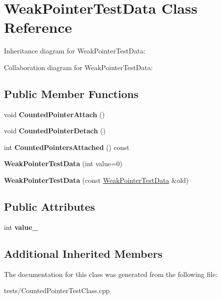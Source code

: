 \hypertarget{classWeakPointerTestData}{}\section{Weak\+Pointer\+Test\+Data Class Reference}
\label{classWeakPointerTestData}


Inheritance diagram for Weak\+Pointer\+Test\+Data\+:


Collaboration diagram for Weak\+Pointer\+Test\+Data\+:
\subsection*{Public Member Functions}
\begin{DoxyCompactItemize}
\item 
\mbox{\label{classWeakPointerTestData_a91e3f8b4524a21f2a07d605fdb14a93a}} 
void {\bfseries Counted\+Pointer\+Attach} ()
\item 
\mbox{\label{classWeakPointerTestData_a84090e221035b13398b36d0d2f37fba5}} 
void {\bfseries Counted\+Pointer\+Detach} ()
\item 
\mbox{\label{classWeakPointerTestData_a7e84585c2baef84494d9cddcf968484b}} 
int {\bfseries Counted\+Pointers\+Attached} () const
\item 
\mbox{\label{classWeakPointerTestData_add097ad8835b9199be8db68a24e6c7e7}} 
{\bfseries Weak\+Pointer\+Test\+Data} (int value=0)
\item 
\mbox{\label{classWeakPointerTestData_a3648b15c2f64916d94a03cf8dddbc965}} 
{\bfseries Weak\+Pointer\+Test\+Data} (const \hyperlink{classWeakPointerTestData}{Weak\+Pointer\+Test\+Data} \&old)
\end{DoxyCompactItemize}
\subsection*{Public Attributes}
\begin{DoxyCompactItemize}
\item 
\mbox{\label{classWeakPointerTestData_a991a5d1fe2735063f3cb14baaf22fc61}} 
int {\bfseries value\+\_\+}
\end{DoxyCompactItemize}
\subsection*{Additional Inherited Members}


The documentation for this class was generated from the following file\+:\begin{DoxyCompactItemize}
\item 
tests/Counted\+Pointer\+Test\+Class.\+cpp\end{DoxyCompactItemize}
